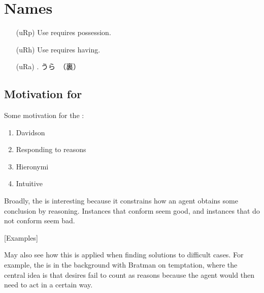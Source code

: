 \documentclass[10pt]{article}
\begin{document}
\newpage

\section{Names}
\label{sec:names}

\begin{itemize}
\item[(uRp)] Use requires possession.
\item[(uRh)] Use requires having.
\item[(uRa)] \mp{-}.\newline
  うら　（裏）
\end{itemize}



\subsection{Motivation for \mp{}}
\label{sec:motiv-main-prem}

Some motivation for the \mp{}:

\begin{enumerate}
\item Davidson
\item Responding to reasons
\item Hieronymi
\item Intuitive
\end{enumerate}

Broadly, the \mp{} is interesting because it constrains how an agent obtains some conclusion by reasoning.
Instances that conform seem good, and instances that do not conform seem bad.

[Examples]

May also see how this is applied when finding solutions to difficult cases.
For example, the \mp{} is in the background with Bratman on temptation, where the central idea is that desires fail to count as reasons because the agent would then need to act in a certain way.
\end{document}
